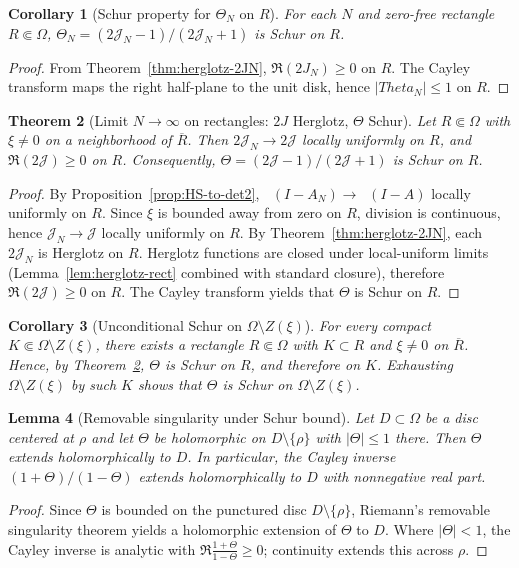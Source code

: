 \documentclass[11pt]{article}
\newtheorem{theorem}{Theorem}
\newtheorem{lemma}[theorem]{Lemma}
\newtheorem{corollary}[theorem]{Corollary}
\theoremstyle{definition}
\theoremstyle{remark}
\DeclareMathOperator{\dettwo}{det_2}
\begin{document}
\begin{corollary}[Schur property for \(\Theta_N\) on \(R\)]\label{cor:ThetaN-Schur-R}
For each \(N\) and zero-free rectangle \(R\Subset\Omega\), \(\Theta_N=(2\mathcal J_N-1)/(2\mathcal J_N+1)\) is Schur on \(R\).
\end{corollary}
\begin{proof}
From Theorem~\ref{thm:herglotz-2JN}, \(\Re(2J_N)\ge 0\) on \(R\). The Cayley transform maps the right half-plane to the unit disk, hence \(|Theta_N|\le 1\) on \(R\).
\end{proof}
\begin{theorem}[Limit \(N\to\infty\) on rectangles: \(2J\) Herglotz, \(\Theta\) Schur]\label{thm:limit-rect}
Let \(R\Subset\Omega\) with \(\xi\neq 0\) on a neighborhood of \(\overline R\). Then \(2\mathcal J_N\to 2\mathcal J\) locally uniformly on \(R\), and \(\Re(2\mathcal J)\ge 0\) on \(R\). Consequently, \(\Theta=(2\mathcal J-1)/(2\mathcal J+1)\) is Schur on \(R\).
\end{theorem}
\begin{proof}
By Proposition~\ref{prop:HS-to-det2}, \(\dettwo(I-A_N)\to \dettwo(I-A)\) locally uniformly on \(R\). Since \(\xi\) is bounded away from zero on \(R\), division is continuous, hence \(\mathcal J_N\to \mathcal J\) locally uniformly on \(R\). By Theorem~\ref{thm:herglotz-2JN}, each \(2\mathcal J_N\) is Herglotz on \(R\). Herglotz functions are closed under local-uniform limits (Lemma~\ref{lem:herglotz-rect} combined with standard closure), therefore \(\Re(2\mathcal J)\ge 0\) on \(R\). The Cayley transform yields that \(\Theta\) is Schur on \(R\).
\end{proof}
\begin{corollary}[Unconditional Schur on \(\Omega\setminus Z(\xi)\)]\label{cor:Schur-off-zeros}
For every compact \(K\Subset \Omega\setminus Z(\xi)\), there exists a rectangle \(R\Subset\Omega\) with \(K\subset R\) and \(\xi\neq 0\) on \(\overline R\). Hence, by Theorem~\ref{thm:limit-rect}, \(\Theta\) is Schur on \(R\), and therefore on \(K\). Exhausting \(\Omega\setminus Z(\xi)\) by such \(K\) shows that \(\Theta\) is Schur on \(\Omega\setminus Z(\xi)\).
\end{corollary}

\begin{lemma}[Removable singularity under Schur bound]\label{lem:removable-schur}
Let $D\subset\Omega$ be a disc centered at $\rho$ and let $\Theta$ be holomorphic on $D\setminus\{\rho\}$ with $|\Theta|\le 1$ there. Then $\Theta$ extends holomorphically to $D$. In particular, the Cayley inverse $(1+\Theta)/(1-\Theta)$ extends holomorphically to $D$ with nonnegative real part.
\end{lemma}
\begin{proof}
Since $\Theta$ is bounded on the punctured disc $D\setminus\{\rho\}$, Riemann's removable singularity theorem yields a holomorphic extension of $\Theta$ to $D$. Where $|\Theta|<1$, the Cayley inverse is analytic with $\Re\tfrac{1+\Theta}{1-\Theta}\ge 0$; continuity extends this across $\rho$.
\end{proof}
\end{document}
